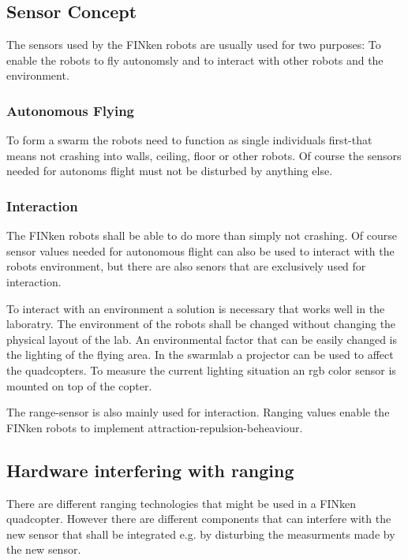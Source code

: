 \subsection{Sensor Concept}
The sensors used by the FINken robots are usually used for two purposes: To enable the robots to fly autonomsly and to interact with other robots and the environment.

\subsubsection{Autonomous Flying}
To form a swarm the robots need to function as single individuals first-that means not crashing into walls, ceiling, floor or other robots.
Of course the sensors needed for autonoms flight must not be disturbed by anything else. 


\subsubsection{Interaction}

The FINken robots shall be able to do more than simply not crashing.
Of course sensor values needed for autonomous flight can also be used to interact with the robots environment, but there are also senors that are exclusively used for interaction.

To interact with an environment a solution is necessary that works well in the laboratry.
The environment of the robots shall be changed without changing the physical layout of the lab.
An environmental factor that can be easily changed is the lighting of the flying area.
In the swarmlab a projector can be used to affect the quadcopters.
To measure the current lighting situation an rgb color sensor is mounted on top of the copter.

The range-sensor is also mainly used for interaction.
Ranging values enable the FINken robots to implement attraction-repulsion-beheaviour.

\subsection{Hardware interfering with ranging}
There are different ranging technologies that might be used in a FINken quadcopter.
However there are different components that can interfere with the new sensor that shall be integrated e.g. by disturbing the measurments made by the new sensor.


